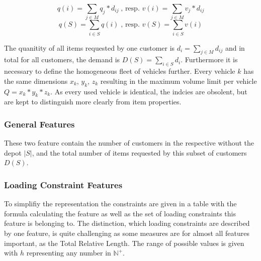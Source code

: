 \[q(i) = \sum_{j \in M} q_j * d_{ij}\;\text{, resp. } v(i) = \sum_{j \in M} v_j * d_{ij}\]
\[q(S) = \sum_{i\in S} q(i)\;\text{, resp. } v(S) = \sum_{i\in S} v(i)\]

The quanitity of all items requested by one customer is $d_i = \sum_{j \in M} d_{ij}$ and in total for all customers,
the demand is $D(S) = \sum_{i\in S} d_i$. Furthermore it is necessary to define the homogeneous fleet of vehicles
further. Every vehicle $k$ has the same dimensions {$x_k$, $y_k$, $z_k$} resulting in the maximum volume limit per
vehicle $Q = x_k *y_k*z_k$. As every used vehicle is identical, the indcies are obsolent, but are kept to distinguish more clearly
from item properties.

\subsubsection{General Features}
These two feature contain the number of customers in the respective without the depot $|S|$, and the total number of items requested by
this subset of customers $D(S)$.

\subsubsection{Loading Constraint Features}

To simplifiy the representation the constraints are given in a table with the formula calculating the feature as well as the set of
loading constraints this feature is belonging to. The distinction, which loading constraints are described by one feature, is quite
challenging as some measures are for almost all features important, as the Total Relative Length. The range of possible values is
given with $h$ representing any number in $\mathbb{N}^{+}$.

